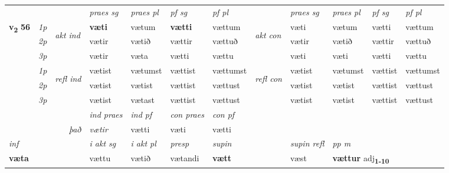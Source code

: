 \begin{longtable}[l]{X>{\footnotesize\itshape}llXXXXlXXXX}
\midrule

 & &   & \textit{praes sg}  & \textit{praes pl}    & \textit{ pf sg} & \textit{pf pl} & & \textit{praes sg}  & \textit{praes pl}    & \textit{pf sg} & \textit{pf pl }  \\ \cmidrule{4-7} \cmidrule{9-12}
 \multirow{2}{*}{{{\textbf{v{\textsubscript{2}}} \Large{\textbf{56}}}}}  & 1p & \multirow{3}{*}{\begin{turn}{90}\textit{akt ind}\end{turn}} & \textbf{væti} & vætum & \textbf{vætti} & vættum & \multirow{3}{*}{\begin{turn}{90}\textit{akt con}\end{turn}} &væti & vætum & vætti & vættum\\*
 & 2p &  &  vætir  & vætið & vættir & vættuð & & vætir & vætið & vættir & vættuð \\*
 & 3p &  & vætir & væta & vætti & vættu & & væti & væti& vætti & vættu \\*
\cmidrule{4-7} \cmidrule{9-12}
 & 1p & \multirow{3}{*}{\begin{turn}{90}\textit{refl ind}\end{turn}}  & vætist & vætumst & vættist & vættumst & \multirow{3}{*}{\begin{turn}{90}\textit{refl con}\end{turn}}  &vætist & vætumst & vættist & vættumst \\*
 & 2p &  & vætist & vætist & vættist & vættust & &vætist & vætist & vættist & vættust \\*
 & 3p  & & vætist & vætast & vættist & vættust & & vætist & vætist& vættist & vættust \\*
\cmidrule{4-7} \cmidrule{9-12}

   && &  \textit{ind praes} & \textit{ind pf} & \textit{con praes} & \textit{con pf} \\*
\multicolumn{3}{r}{\textit{það}} & vætir & vætti & væti & vætti \\*

\cmidrule{4-7}
   {\textit{inf}} & &  & \textit{i akt sg} & \textit{i akt pl}   & \textit{presp} & \textit{supin} && \textit{supin refl} & \textit{pp m} \\*
  {\textbf{væta}} & && vættu  & vætið   & vætandi &  \textbf{vætt} && væst & \multicolumn{2}{l}{\textbf{vættur} adj\textbf{\textsubscript{1-10}}} \\*

\midrule


\end{longtable}
